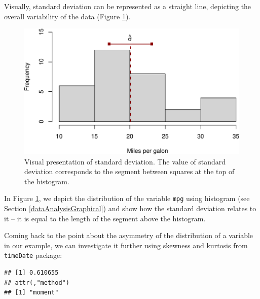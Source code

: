 \documentclass[
]{book}
\newenvironment{Shaded}{\begin{snugshade}}{\end{snugshade}}
\newcommand{\FunctionTok}[1]{\textcolor[rgb]{0.13,0.29,0.53}{\textbf{#1}}}
\newcommand{\NormalTok}[1]{#1}
\newcommand{\SpecialCharTok}[1]{\textcolor[rgb]{0.81,0.36,0.00}{\textbf{#1}}}
\theoremstyle{definition}
\theoremstyle{definition}
\theoremstyle{definition}
\theoremstyle{definition}
\theoremstyle{remark}
\begin{document}
Visually, standard deviation can be represented as a straight line, depicting the overall variability of the data (Figure \ref{fig:varianceVisual}).

\begin{figure}
\centering
\includegraphics{Svetunkov---Statistics-for-Business-Analytics_files/figure-latex/varianceVisual-1.pdf}
\caption{\label{fig:varianceVisual}Visual presentation of standard deviation. The value of standard deviation corresponds to the segment between squares at the top of the histogram.}
\end{figure}

In Figure \ref{fig:varianceVisual}, we depict the distribution of the variable \texttt{mpg} using histogram (see Section \ref{dataAnalysisGraphical}) and show how the standard deviation relates to it -- it is equal to the length of the segment above the histogram.

Coming back to the point about the asymmetry of the distribution of a variable in our example, we can investigate it further using skewness and kurtosis from \texttt{timeDate} package:

\begin{Shaded}
\end{Shaded}

\begin{verbatim}
## [1] 0.610655
## attr(,"method")
## [1] "moment"
\end{verbatim}

\begin{Shaded}
\end{Shaded}
\end{document}
